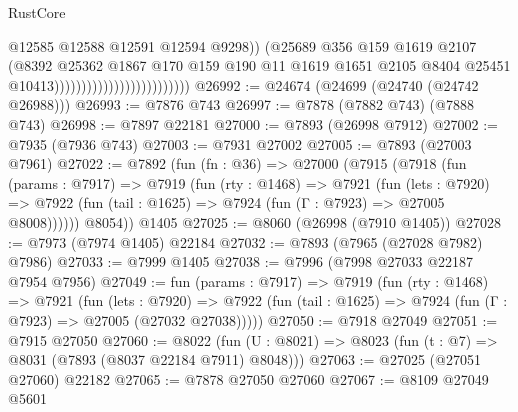 \begin{lexlean}{RustCore}
\begin{coremodule}
                                                      @12585
                                                      @12588
                                                      @12591
                                                      @12594
                                                      @9298))
                                                  (@25689
                                                    @356
                                                    @159
                                                    @1619
                                                    @2107
                                                    (@8392
                                                      @25362
                                                      @1867
                                                      @170
                                                      @159
                                                      @190
                                                      @11
                                                      @1619
                                                      @1651
                                                      @2105
                                                      @8404
                                                      @25451
                                                      @10413)))))))))))))))))))))))))
@26992 := @24674 (@24699 (@24740 (@24742 @26988)))
@26993 := @7876 @743
@26997 := @7878 (@7882 @743) (@7888 @743)
@26998 := @7897 @22181
@27000 := @7893 (@26998 @7912)
@27002 := @7935 (@7936 @743)
@27003 := @7931 @27002
@27005 := @7893 (@27003 @7961)
@27022 := @7892
    (fun (fn : @36) =>
    @27000
      (@7915
        (@7918
          (fun (params : @7917) =>
          @7919
            (fun (rty : @1468) =>
            @7921
              (fun (lets : @7920) =>
              @7922 (fun (tail : @1625) => @7924 (fun (Γ : @7923) => @27005 @8008))))))
        @8054))
    @1405
@27025 := @8060 (@26998 (@7910 @1405))
@27028 := @7973 (@7974 @1405) @22184
@27032 := @7893 (@7965 (@27028 @7982) @7986)
@27033 := @7999 @1405
@27038 := @7996 (@7998 @27033 @22187 @7954 @7956)
@27049 := fun (params : @7917) =>
  @7919
    (fun (rty : @1468) =>
    @7921
      (fun (lets : @7920) =>
      @7922 (fun (tail : @1625) => @7924 (fun (Γ : @7923) => @27005 (@27032 @27038)))))
@27050 := @7918 @27049
@27051 := @7915 @27050
@27060 := @8022
    (fun (U : @8021) => @8023 (fun (t : @7) => @8031 (@7893 (@8037 @22184 @7911) @8048)))
@27063 := @27025 (@27051 @27060) @22182
@27065 := @7878 @27050 @27060
@27067 := @8109 @27049 @5601

\end{coremodule}
\end{lexlean}
